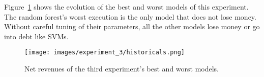 

Figure~\ref{fig:exp3_historicals} shows the evolution of the best and worst models of this experiment. The random forest's worst execution is the only model that does not lose money. Without careful tuning of their parameters, all the other models lose money or go into debt like SVMs.

\begin{figure}
    \centering
    \texttt{[image: images/experiment\_3/historicals.png]}
    \caption{\small Net revenues of the third experiment's best and worst models.}
    \label{fig:exp3_historicals}
\end{figure}

